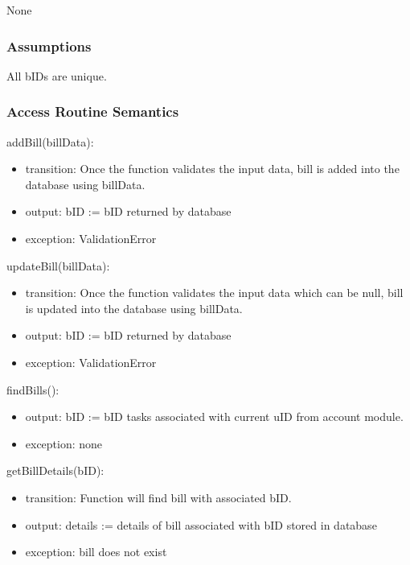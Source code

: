 \documentclass[12pt, titlepage]{article}
\begin{document}
None


\subsubsection{Assumptions}

All bIDs are unique.


\subsubsection{Access Routine Semantics}

\noindent addBill(billData):
\begin{itemize}
\item transition: Once the function validates the input data, bill is added into the database
using billData.
\item output: bID := bID returned by database
\item exception: ValidationError
\end{itemize}

\noindent updateBill(billData):
\begin{itemize}
\item transition: Once the function validates the input data which can be null, bill is updated into the database
using billData.
\item output: bID := bID returned by database
\item exception: ValidationError
\end{itemize}

\noindent findBills():
\begin{itemize}
\item output: bID := bID tasks associated with current uID from account module.
\item exception: none
\end{itemize}

\noindent getBillDetails(bID):
\begin{itemize}
\item transition: Function will find bill with associated bID.
\item output: details := details of bill associated with bID stored in database
\item exception: bill does not exist
\end{itemize}
\end{document}
